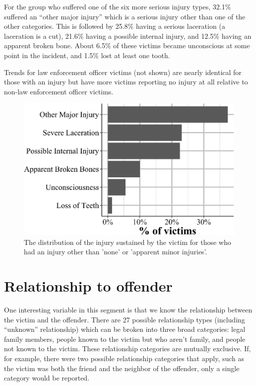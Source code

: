 \documentclass[
  12pt,
  openany]{book}
\begin{document}
For the group who suffered one of the six more serious injury types, 32.1\% suffered an ``other major injury'' which is a serious injury other than one of the other categories. This is followed by 25.8\% having a serious laceration (a laceration is a cut), 21.6\% having a possible internal injury, and 12.5\% having an apparent broken bone. About 6.5\% of these victims became unconscious at some point in the incident, and 1.5\% lost at least one tooth.

Trends for law enforcement officer victims (not shown) are nearly identical for those with an injury but have more victims reporting no injury at all relative to non-law enforcement officer victims.

\begin{figure}

{\centering \includegraphics[width=0.9\linewidth]{15_nibrs_victim_files/figure-latex/victimInjuryExcludeNone-1} 

}

\caption{The distribution of the injury sustained by the victim for those who had an injury other than 'none' or 'apparent minor injuries'.}\label{fig:victimInjuryExcludeNone}
\end{figure}

\section{Relationship to offender}\label{relationship-to-offender}

One interesting variable in this segment is that we know the relationship between the victim and the offender. There are 27 possible relationship types (including ``unknown'' relationship) which can be broken into three broad categories: legal family members, people known to the victim but who aren't family, and people not known to the victim. These relationship categories are mutually exclusive. If, for example, there were two possible relationship categories that apply, such as the victim was both the friend and the neighbor of the offender, only a single category would be reported.
\end{document}
